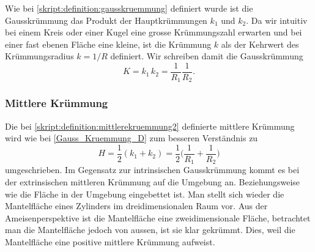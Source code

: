\begin{refsection}
Wie bei \ref{skript:definition:gausskruemmung} definiert wurde ist die Gausskrümmung das Produkt der Hauptkrümmungen $k_1$ und $k_2$. 
Da wir intuitiv bei einem Kreis oder einer Kugel eine grosse Krümmungszahl erwarten und bei einer fast ebenen Fläche eine kleine, ist die Krümmung $k$ als der Kehrwert des Krümmungsradius $k=1/R$ definiert.
Wir schreiben damit die Gausskrümmung
\begin{equation} \label{Gauss_Kruemmung_D}
 K=k_1\, k_2= \frac{1}{R_1}\frac{1}{R_2}.
\end{equation}

\subsubsection{Mittlere Krümmung} 


Die bei \ref{skript:definition:mittlerekruemmung2} definierte mittlere Krümmung wird wie bei \eqref{Gauss_Kruemmung_D} zum besseren Verständnis zu
\begin{equation} \label{Mittlere Kruemmung_D}
H=\frac{1}{2}(k_1+k_2)= \frac{1}{2}\bigg(\frac{1}{R_1}+\frac{1}{R_2}\bigg)
\end{equation}
umgeschrieben.
Im Gegensatz zur intrinsischen Gausskrümmung kommt es bei der extrinsischen mittleren Krümmung auf die Umgebung an. Beziehungsweise wie die Fläche in der Umgebung eingebettet ist.
Man stellt sich wieder die Mantelfläche eines Zylinders im dreidimensionalen Raum vor.
Aus der Ameisenperspektive ist die Mantelfläche eine zweidimensionale Fläche, betrachtet man die Mantelfläche jedoch von aussen, ist sie klar gekrümmt.
Dies, weil die Mantelfläche eine positive mittlere Krümmung aufweist. 



\end{refsection}
